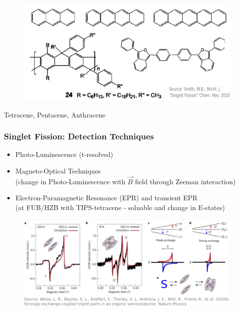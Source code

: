 \documentclass[compress]{beamer}
\begin{document}
\begin{frame}
\begin{multicols}{2}
\begin{figure}[H]
\vspace{-40pt}\includegraphics[width=1\columnwidth]{../img/SF_esq21.pdf}
\end{figure}
\vspace{-15pt}\footnotesize Tetracene, Pentacene, Anthracene\\


\end{multicols}

\end{frame}


\begin{frame}
  \frametitle{Singlet Fission: Detection Techniques}
\normalsize
\begin{itemize}
\item Photo-Luminescence (t-resolved)
\item Magneto-Optical Techniques\\
\hspace{10pt}\footnotesize (change in Photo-Luminescence with $\overrightarrow{B}$ field through Zeeman interaction)
\normalsize
\item Electron-Paramagnetic Resonance (EPR) and transient EPR\\
\hspace{10pt}\footnotesize (at FUB/HZB with TIPS-tetracene - soluable and change in E-states)
\end{itemize}
\begin{figure}[H]
\includegraphics[width=1\columnwidth]{../img/SF_HZB.pdf}
\end{figure}


\end{frame}
\end{document}
